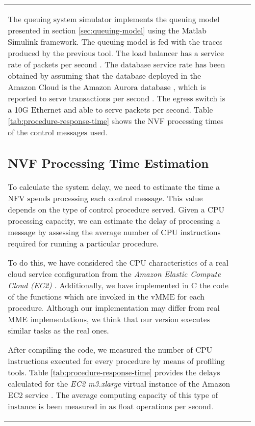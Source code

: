 \documentclass[conference]{IEEEtran}
\begin{document}
\begin{table*}[tb]
{\begin{tabularx}{\textwidth}{l|l|X}
{The queuing system simulator implements the queuing model presented in section \ref{sec:queuing-model} using the Matlab Simulink framework. The queuing model is fed with the traces produced by the previous tool. The load balancer has a service rate of  packets per second \cite{rightscal}.  The database service rate has been obtained by assuming that the database deployed in the Amazon Cloud is the Amazon Aurora database \cite{amazon-ec2}, which is reported to serve  transactions per second \cite{aurora-benchmark-2015}. The egress switch is a 10G Ethernet and able to serve  packets per second. Table \ref{tab:procedure-response-time} shows the NVF processing times of the control messages used.





\subsection{NVF Processing Time Estimation}
\label{sec:cpu-numerical-results}


 To calculate the system delay, we need to estimate the time a NFV spends processing each control message. This value depends on the type of control procedure served. Given a CPU processing capacity, we can estimate the delay of processing a message by assessing the average number of CPU instructions required for running a particular procedure.
 
 To do this, we have considered the CPU characteristics of a real cloud service configuration from the \emph{Amazon Elastic Compute Cloud (EC2)} \cite{amazon-ec2}. Additionally, we have implemented in C the code of the functions which are invoked in the vMME for each procedure. Although our implementation may differ from real MME implementations, we think that our version executes similar tasks as the real ones. 
 
  After compiling the code, we measured the number of CPU instructions executed for every procedure by means of profiling tools. Table \ref{tab:procedure-response-time} provides the delays calculated for the \emph{EC2 m3.xlarge}  virtual instance of the Amazon EC2 service \cite{amazon-ec2}. The average computing capacity of this type of instance is been measured in \cite{iosup2011performance} as  float operations per second.
  











}
\end{tabularx}}
\end{table*}
\end{document}
